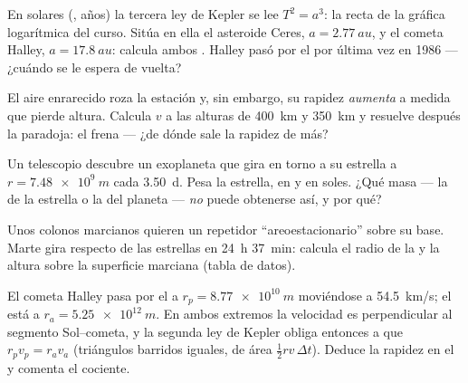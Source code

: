 \begin{exercise}[$\star\star$]\label{exo:g12:satellites-kepler:11}
En  solares (, años) la tercera ley de Kepler se lee
$T^2 = a^3$: la recta de la gráfica logarítmica del curso. Sitúa en ella el asteroide
Ceres, $a = \qty{2.77}{au}$, y el cometa Halley, $a = \qty{17.8}{au}$: calcula ambos
. Halley pasó por el  por última vez en 1986 --- ¿cuándo se le
espera de vuelta?
\end{exercise}

\begin{exercise}[$\star\star\star$]\label{exo:g12:satellites-kepler:12}
El aire enrarecido roza la estación y, sin embargo, su rapidez \emph{aumenta} a medida
que pierde altura. Calcula $v$ a las alturas de \qty{400}{km} y \qty{350}{km} y
resuelve después la paradoja: el  frena --- ¿de dónde sale la rapidez de
más?
\end{exercise}

\begin{exercise}[$\star\star\star$]\label{exo:g12:satellites-kepler:13}
Un telescopio descubre un exoplaneta que gira en torno a su estrella a
$r = \qty{7.48e9}{m}$ cada \qty{3.50}{d}. Pesa la estrella, en  y en soles.
¿Qué masa --- la de la estrella o la del planeta --- \emph{no} puede obtenerse así, y
por qué?
\end{exercise}

\begin{exercise}[$\star\star\star$]\label{exo:g12:satellites-kepler:14}
Unos colonos marcianos quieren un repetidor ``areoestacionario'' sobre su base. Marte
gira respecto de las estrellas en \qty{24}{h} \qty{37}{min}: calcula el radio de la
 y la altura sobre la superficie marciana (tabla de datos).
\end{exercise}

\begin{exercise}[$\star\star\star$]\label{exo:g12:satellites-kepler:15}
El cometa Halley pasa por el  a $r_p = \qty{8.77e10}{m}$ moviéndose a
\qty{54.5}{km/s}; el  está a $r_a = \qty{5.25e12}{m}$. En ambos extremos la
velocidad es perpendicular al segmento Sol--cometa, y la segunda ley de Kepler obliga
entonces a que $r_p v_p = r_a v_a$ (triángulos barridos iguales, de área
$\tfrac12 r v\,\Delta t$). Deduce la rapidez en el  y comenta el cociente.
\end{exercise}

